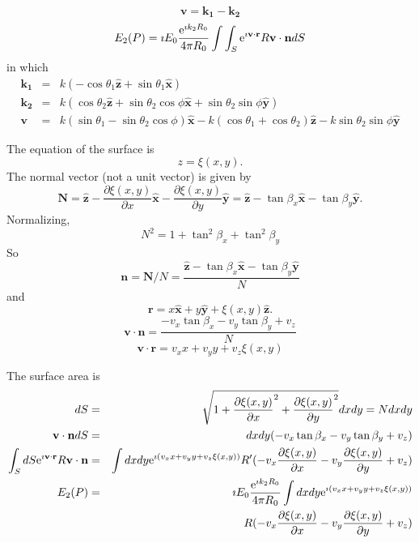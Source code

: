 \documentclass[11pt,openany]{report}
\newcommand{\pder}[2]{\frac{\partial {#1}}{\partial {#2}}}
\newcommand{\e}{{\rm e}}
\newcommand{\bm}[1]{\mathbf{#1}}
\begin{document}
{{\begin{equation}
\bm{v}=\bm{k_{1}}-\bm{k_{2}}
  \end{equation}
  \begin{equation}
E_{2}(P)=\imath E_{0}\frac{\e^{\imath k_{2}R_{0}}}{4\pi R_{0}}
\int\int_{S}\e^{\imath\bm{v}\cdot\bm{r}}R\bm{v}\cdot\bm{n}dS
  \end{equation}
in which
  \begin{eqnarray}
\bm{k_{1}} &=& k\left(-\cos{\theta_{1}}\bm{\hat z}+
  \sin{\theta_{1}}\bm{\hat x}\right) \\
\bm{k_{2}} &=& k\left(\cos{\theta_{2}}\bm{\hat z}+
  \sin{\theta_{2}}\cos{\phi}\bm{\hat x}+\sin{\theta_{2}}\sin{\phi}\bm{\hat y}\right) \\
\bm{v} &=& k(\sin{\theta_{1}}-\sin{\theta_{2}}\cos{\phi})\bm{\hat x}-
k(\cos{\theta_{1}}+\cos{\theta_{2}})\bm{\hat z}-k\sin{\theta_{2}}\sin{\phi}\bm{\hat y}
  \end{eqnarray}

The equation of the surface is
  \begin{equation}
z=\xi(x,y).
  \end{equation}
The normal vector (not a unit vector) is given by
  \begin{equation}
\bm{N}=\bm{\hat z}-\pder{\xi(x,y)}{x}\bm{\hat x}-
\pder{\xi(x,y)}{y}\bm{\hat y}=\bm{\hat z}-\tan\beta_{x}\bm{\hat x}-\tan\beta_{y}\bm{\hat y}.
  \end{equation}
Normalizing,
  \begin{equation}
N^{2}=1+\tan^{2}\beta_{x}+\tan^{2}\beta_{y}
  \end{equation}
So
  \begin{equation}
\bm{n}=\bm{N}/N=\frac{\bm{\hat z}-\tan\beta_{x}\bm{\hat x}-\tan\beta_{y}\bm{\hat y}}{N}
  \end{equation}
and
  \begin{equation}
\bm{r}=x\bm{\hat x}+y\bm{\hat y}+\xi(x,y)\bm{\hat z}.
  \end{equation}
  \begin{equation}
\bm{v}\cdot\bm{n}=\frac{-v_{x}\tan{\beta_{x}}-v_{y}\tan{\beta_{y}}+v_{z}}{N}
  \end{equation}
  \begin{equation}
\bm{v}\cdot\bm{r}=v_{x}x+v_{y}y+v_{z}\xi(x,y)
  \end{equation}

The surface area is
  \begin{eqnarray}
dS &=& \sqrt{1+\pder{\xi(x,y)}{x}^{2}+\pder{\xi(x,y)}{y}^{2}}dxdy=Ndxdy \\
\bm{v}\cdot\bm{n}dS &=& dxdy(-v_{x}\tan{\beta_{x}}-v_{y}\tan{\beta_{y}}+v_{z}) \\
\int_{S}dS\e^{\imath\bm{v}\cdot\bm{r}}R\bm{v}\cdot\bm{n} &=&
\int dx dy\e^{\imath( v_{x}x+v_{y}y+v_{z}\xi(x,y))}R'(-v_{x}\pder{\xi(x,y)}{x}-v_{y}\pder{\xi(x,y)}{y}+v_{z}) \\
E_{2}(P) &=& \imath E_{0}\frac{\e^{\imath k_{2}R_{0}}}{4\pi R_{0}}
\int dx dy\e^{\imath( v_{x}x+v_{y}y+v_{z}\xi(x,y))} \\
  && \qquad R(-v_{x}\pder{\xi(x,y)}{x}-v_{y}\pder{\xi(x,y)}{y}+v_{z}) \nonumber
  \end{eqnarray}

}}
\end{document}
